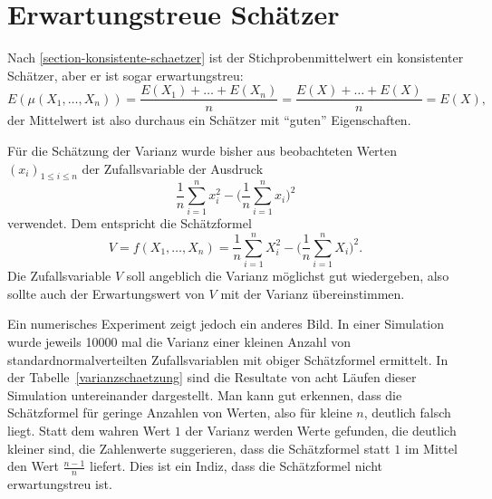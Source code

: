 \section{Erwartungstreue Schätzer} \label{section-erwartungstreue-schaetzer}
Nach \ref{section-konsistente-schaetzer} ist der Stichprobenmittelwert
ein konsistenter Schätzer,
aber er ist sogar erwartungstreu:
\[
E(\mu(X_1,\dots,X_n))=\frac{E(X_1)+\dots+E(X_n)}{n}=\frac{E(X)+\dots+E(X)}{n}
=E(X),
\]
der Mittelwert ist also durchaus ein Schätzer mit ``guten'' Eigenschaften.

Für die Schätzung der Varianz wurde bisher aus beobachteten Werten
$(x_i)_{1\le i\le n}$ der Zufallsvariable der Ausdruck
\begin{equation}
\frac1n\sum_{i=1}^n x_i^2-\biggl(\frac1n\sum_{i=1}^nx_i\biggr)^2
\end{equation}
verwendet.
Dem entspricht die Schätzformel
\begin{equation}
V=f(X_1,\dots,X_n)=\frac1n\sum_{i=1}^nX_i^2-\biggl(\frac1n\sum_{i=1}^nX_i\biggr)^2.
\label{schaetzer-sstern}
\end{equation}
Die Zufallsvariable $V$ soll angeblich die Varianz möglichst gut
wiedergeben, also sollte auch der Erwartungswert von $V$ mit der Varianz
übereinstimmen.

Ein numerisches Experiment zeigt jedoch ein anderes Bild.
In einer
Simulation wurde jeweils 10000 mal die Varianz einer kleinen Anzahl von
standardnormalverteilten Zufallsvariablen mit obiger Schätzformel ermittelt.
In der Tabelle~\ref{varianzschaetzung} sind die Resultate von acht
Läufen dieser Simulation untereinander dargestellt.
Man kann gut erkennen, 
dass die Schätzformel für geringe Anzahlen von Werten, also für kleine
$n$, deutlich falsch liegt.
Statt dem wahren Wert $1$ der Varianz
werden Werte gefunden, die deutlich kleiner sind, die Zahlenwerte
suggerieren, dass die Schätzformel statt $1$ im Mittel den Wert
$\frac{n-1}n$ liefert.
Dies ist ein Indiz, dass die Schätzformel nicht
erwartungstreu ist.

